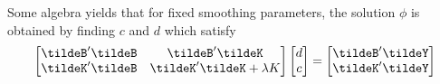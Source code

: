 \noindent
Some algebra yields that for fixed smoothing parameters, the solution $\phi$ is obtained by finding $c$ and $d$ which satisfy
\begin{equation} \label{eq:vectorized-normal-equations}
\begin{bmatrix}
\tildeB'\tildeB & \tildeB'\tildeK \\
\tildeK'\tildeB & \tildeK'\tildeK + \lambda K\\
\end{bmatrix}
\begin{bmatrix}
d\\
c\\
\end{bmatrix}
= \begin{bmatrix}
\tildeB'\tildeY \\
 \tildeK'\tildeY\\
\end{bmatrix}
\end{equation}

